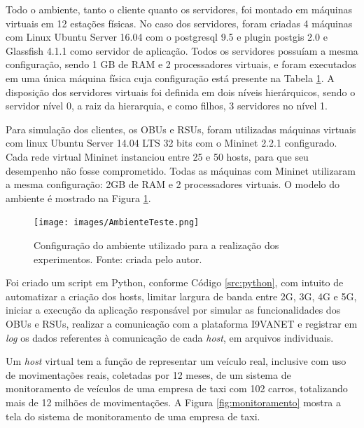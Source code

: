 \documentclass[
	12pt,				%
	oneside,			%
	a4paper,			%
	english,			%
	brazil				%
	]{abntex2ppgsi}
\begin{document}
Todo o ambiente, tanto o cliente quanto os servidores, foi montado em máquinas virtuais em 12 estações físicas. No caso dos servidores,  foram criadas 4 máquinas com Linux Ubuntu Server 16.04 com o postgresql 9.5 e plugin postgis 2.0 e Glassfish 4.1.1 como servidor de aplicação. Todos os servidores possuíam a mesma configuração, sendo 1 GB de RAM e 2 processadores virtuais, e foram executados em uma única máquina física cuja configuração está presente na Tabela \ref{fig:cenarioConsiderado}. A disposição dos servidores virtuais foi definida em dois níveis hierárquicos, sendo o servidor nível 0, a raiz da hierarquia, e como filhos,  3 servidores no nível 1.


Para simulação dos clientes, os OBUs e RSUs, foram utilizadas máquinas virtuais com linux Ubuntu Server 14.04 LTS 32 bits com o Mininet 2.2.1 configurado. Cada rede virtual Mininet instanciou entre 25 e 50 hosts, para que seu desempenho não fosse comprometido. Todas as máquinas com Mininet  utilizaram a mesma configuração:  2GB de RAM e 2 processadores virtuais. O modelo do ambiente é mostrado na Figura \ref{fig:cenarioConsiderado}.


\begin{figure}[h!]
	\centering
	\texttt{[image: images/AmbienteTeste.png]}
	\caption{Configuração do ambiente utilizado para a realização dos experimentos. Fonte: criada pelo autor.}
	\label{fig:cenarioConsiderado}
\end{figure}

Foi criado um script em Python, conforme Código \ref{src:python}, com intuito de automatizar a criação dos hosts, limitar largura de banda entre 2G, 3G, 4G e 5G, iniciar a execução da aplicação responsável por simular as funcionalidades dos OBUs e RSUs,  realizar a comunicação com a plataforma I9VANET e registrar em \textit{log} os dados referentes à comunicação de cada \textit{host}, em arquivos individuais.

Um \textit{host} virtual tem a função de representar um veículo real, inclusive com uso de movimentações reais, coletadas por 12 meses, de um sistema de monitoramento de veículos de uma empresa de taxi com 102 carros, totalizando mais de 12 milhões de movimentações. A Figura \ref{fig:monitoramento} mostra a tela do sistema de monitoramento de uma empresa de taxi.
\end{document}
